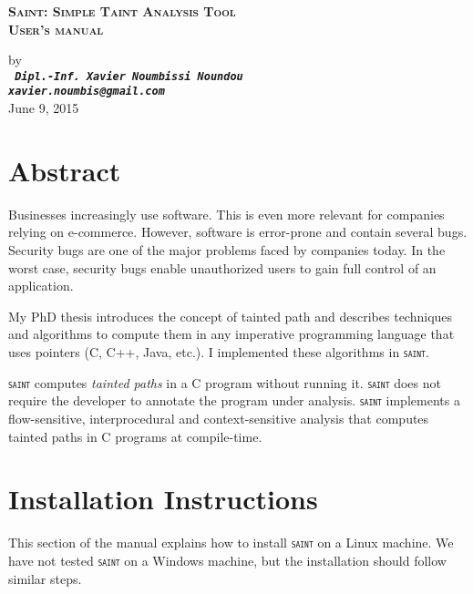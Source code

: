 \documentclass[12pt,onecolumn,a4paper]{article}
\newcommand{\saint}{\texttt{\textsc{saint}}\xspace}
\begin{document}
\pagestyle{empty}

\author{Xavier NOUMBISSI NOUNDOU}

\begin{center}
\begin{LARGE}
\textbf{ \textsc{Saint: Simple Taint Analysis Tool\\
				User's manual}}\\
\end{LARGE}
\begin{large}
\vspace{0.3cm}
by\\
\vspace{0.3cm}
\texttt{ \bf \textit{Dipl.-Inf. Xavier Noumbissi Noundou\\
xavier.noumbis@gmail.com}}\\
\vspace{0.3cm}
June 9, 2015\\
\vspace{1.3cm}
\end{large}
\end{center}

\tableofcontents

\section{Abstract}
Businesses increasingly use software. This is even more
relevant for companies relying on e-commerce. However,
software is error-prone and contain several bugs. Security
bugs are one of the major problems faced by companies today.
In the worst case, security bugs enable unauthorized users
to gain full control of an application.

My PhD thesis introduces the concept of tainted path and
describes techniques and algorithms to compute them in
any imperative programming language that uses
pointers (C, C++, Java, etc.). I implemented these
algorithms in \saint.

\saint computes \textcolor{firebrickred}{\textit{tainted paths}}
in a C program without running it. \saint does not require
the developer to annotate the program under analysis.
\saint implements a flow-sensitive, interprocedural and
context-sensitive analysis that computes tainted paths in
C programs at compile-time.

\section{Installation Instructions}
This section of the manual explains how to install \saint
on a Linux machine. We have not tested \saint on a Windows
machine, but the installation should follow similar steps. 
\end{document}
